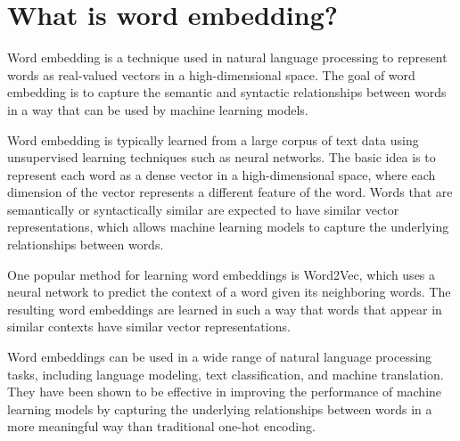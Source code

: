 \section{What is word embedding?}
Word embedding is a technique used in natural language processing to represent words as real-valued vectors in a high-dimensional space. The goal of word embedding is to capture the semantic and syntactic relationships between words in a way that can be used by machine learning models.

Word embedding is typically learned from a large corpus of text data using unsupervised learning techniques such as neural networks. The basic idea is to represent each word as a dense vector in a high-dimensional space, where each dimension of the vector represents a different feature of the word. Words that are semantically or syntactically similar are expected to have similar vector representations, which allows machine learning models to capture the underlying relationships between words.

One popular method for learning word embeddings is Word2Vec, which uses a neural network to predict the context of a word given its neighboring words. The resulting word embeddings are learned in such a way that words that appear in similar contexts have similar vector representations.

Word embeddings can be used in a wide range of natural language processing tasks, including language modeling, text classification, and machine translation. They have been shown to be effective in improving the performance of machine learning models by capturing the underlying relationships between words in a more meaningful way than traditional one-hot encoding.

